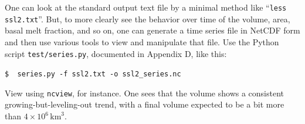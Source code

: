 \documentclass[11pt,final]{amsart}
\begin{document}

One can look at the standard output text file by a minimal method like ``\verb|less ssl2.txt|''.  But, to more clearly see the behavior over time of the volume, area, basal melt fraction, and so on, one can generate a time series file in NetCDF form and then use various tools to view and manipulate that file.  Use the Python script \verb|test/series.py|, documented in Appendix D, like this:

\verb|$  series.py -f ssl2.txt -o ssl2_series.nc|

\noindent View using \verb|ncview|, for instance.  One sees that the volume shows a consistent growing-but-leveling-out trend, with a final volume expected to be a bit more than $4 \times 10^{6}\,\text{km}^3$.
\end{document}
